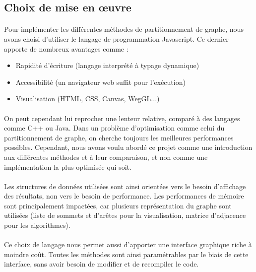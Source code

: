 \documentclass[12pt]{article}
\begin{document}
\subsection{Choix de mise en œuvre}

\paragraph{}Pour implémenter les différentes méthodes de partitionnement de graphe, nous avons choisi d'utiliser le langage de programmation Javascript. Ce dernier apporte de nombreux avantages comme :
\begin{itemize}
	\item Rapidité d'écriture (langage interprété à typage dynamique)
	\item Accessibilité (un navigateur web suffit pour l'exécution)
	\item Visualisation (HTML, CSS, Canvas, WegGL...)
\end{itemize}

\paragraph{}On peut cependant lui reprocher une lenteur relative, comparé à des langages comme C++ ou Java. Dans un problème d'optimisation comme celui du partitionnement de graphe, on cherche toujours les meilleures performances possibles. Cependant, nous avons voulu abordé ce projet comme une introduction aux différentes méthodes et à leur comparaison, et non comme une implémentation la plus optimisée qui soit.

\paragraph{}Les structures de données utilisées sont ainsi orientées vers le besoin d'affichage des résultats, non vers le besoin de performance. Les performances de mémoire sont principalement impactées, car plusieurs représentation du graphe sont utilisées (liste de sommets et d'arêtes pour la visualisation, matrice d'adjacence pour les algorithmes).

\paragraph{}Ce choix de langage nous permet aussi d'apporter une interface graphique riche à moindre coût. Toutes les méthodes sont ainsi paramétrables par le biais de cette interface, sans avoir besoin de modifier et de recompiler le code.
\end{document}
